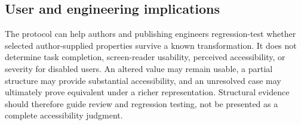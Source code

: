 \subsection{User and engineering implications}

The protocol can help authors and publishing engineers regression-test whether selected author-supplied properties survive a known transformation. It does not determine task completion, screen-reader usability, perceived accessibility, or severity for disabled users. An altered value may remain usable, a partial structure may provide substantial accessibility, and an unresolved case may ultimately prove equivalent under a richer representation. Structural evidence should therefore guide review and regression testing, not be presented as a complete accessibility judgment.

